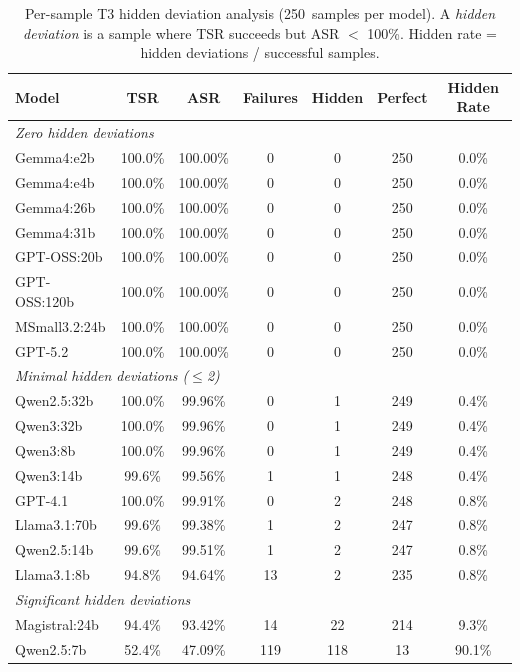 \begin{table}[htbp]
    \centering
    \caption{Per-sample T3 hidden deviation analysis (250~samples per model).
    A \textit{hidden deviation} is a sample where TSR succeeds but ASR $<$ 100\%.
    Hidden rate = hidden deviations / successful samples.}
    \label{tab:hidden_deviations}
    \footnotesize
    \renewcommand{\arraystretch}{0.95}
    \setlength{\tabcolsep}{1.2mm}
    \begin{tabular}{l c c c c c c}
        \toprule
        \textbf{Model} & \textbf{TSR} & \textbf{ASR} & \textbf{Failures} & \textbf{Hidden} & \textbf{Perfect} & \textbf{Hidden Rate} \\
        \midrule
        \multicolumn{7}{l}{\textit{Zero hidden deviations}} \\
        Gemma4:e2b            & 100.0\% & 100.00\% &  0 &   0 & 250 &  0.0\% \\
        Gemma4:e4b            & 100.0\% & 100.00\% &  0 &   0 & 250 &  0.0\% \\
        Gemma4:26b            & 100.0\% & 100.00\% &  0 &   0 & 250 &  0.0\% \\
        Gemma4:31b            & 100.0\% & 100.00\% &  0 &   0 & 250 &  0.0\% \\
        GPT-OSS:20b           & 100.0\% & 100.00\% &  0 &   0 & 250 &  0.0\% \\
        GPT-OSS:120b          & 100.0\% & 100.00\% &  0 &   0 & 250 &  0.0\% \\
        MSmall3.2:24b         & 100.0\% & 100.00\% &  0 &   0 & 250 &  0.0\% \\
        GPT-5.2               & 100.0\% & 100.00\% &  0 &   0 & 250 &  0.0\% \\
        \midrule
        \multicolumn{7}{l}{\textit{Minimal hidden deviations ($\leq$2)}} \\
        Qwen2.5:32b           & 100.0\% &  99.96\% &  0 &   1 & 249 &  0.4\% \\
        Qwen3:32b             & 100.0\% &  99.96\% &  0 &   1 & 249 &  0.4\% \\
        Qwen3:8b              & 100.0\% &  99.96\% &  0 &   1 & 249 &  0.4\% \\
        Qwen3:14b             &  99.6\% &  99.56\% &  1 &   1 & 248 &  0.4\% \\
        GPT-4.1               & 100.0\% &  99.91\% &  0 &   2 & 248 &  0.8\% \\
        Llama3.1:70b          &  99.6\% &  99.38\% &  1 &   2 & 247 &  0.8\% \\
        Qwen2.5:14b           &  99.6\% &  99.51\% &  1 &   2 & 247 &  0.8\% \\
        Llama3.1:8b           &  94.8\% &  94.64\% & 13 &   2 & 235 &  0.8\% \\
        \midrule
        \multicolumn{7}{l}{\textit{Significant hidden deviations}} \\
        Magistral:24b         &  94.4\% &  93.42\% & 14 &  22 & 214 &  9.3\% \\
        Qwen2.5:7b            &  52.4\% &  47.09\% &119 & 118 &  13 & 90.1\% \\
        \bottomrule
    \end{tabular}
\end{table}

